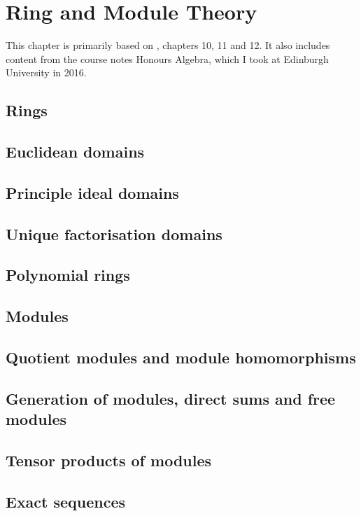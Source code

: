 \chapter{Ring and Module Theory}\label{cha:rings-module-theory}
This chapter is primarily based on \cite{Dummit:Abstract_Algebra}, chapters 10, 11 and 12. It also includes content from the course notes Honours Algebra, which I took at Edinburgh University in 2016.

\section{Rings}

\section{Euclidean domains}

\section{Principle ideal domains}

\section{Unique factorisation domains}

\section{Polynomial rings}

\section{Modules}

\section{Quotient modules and module homomorphisms}

\section{Generation of modules, direct sums and free modules}

\section{Tensor products of modules}

\section{Exact sequences}

